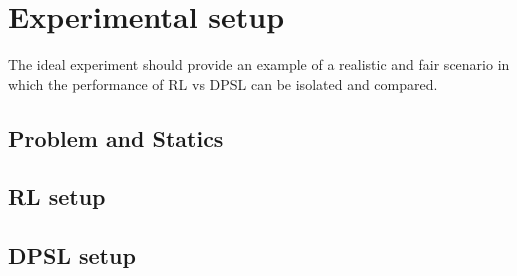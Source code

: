 \section{Experimental setup}
The ideal experiment should provide an example of a realistic and fair scenario in which the performance of RL vs DPSL can be isolated and compared.

\subsection{Problem and Statics}

\subsection{RL setup}

\subsection{DPSL setup}
